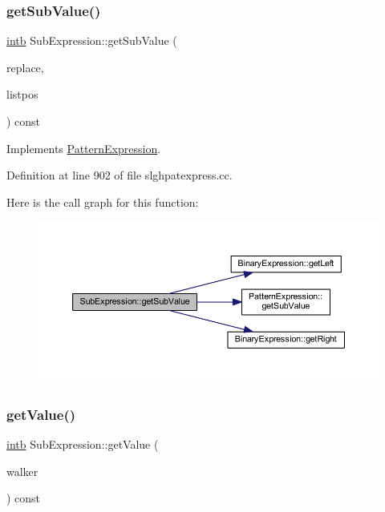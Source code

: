 \subsubsection{\texorpdfstring{getSubValue()}{getSubValue()}}
{\footnotesize\ttfamily \mbox{\hyperlink{types_8h_aa925ba3e627c2df89d5b1cfe84fb8572}{intb}} Sub\+Expression\+::get\+Sub\+Value (\begin{DoxyParamCaption}\item[{const vector$<$ \mbox{\hyperlink{types_8h_aa925ba3e627c2df89d5b1cfe84fb8572}{intb}} $>$ \&}]{replace,  }\item[{int4 \&}]{listpos }\end{DoxyParamCaption}) const\hspace{0.3cm}{\ttfamily [virtual]}}



Implements \mbox{\hyperlink{class_pattern_expression_ade37db4aa76dd442b189bf4a6bb2d9dd}{Pattern\+Expression}}.



Definition at line 902 of file slghpatexpress.\+cc.

Here is the call graph for this function\+:
\nopagebreak
\begin{figure}[H]
\begin{center}
\leavevmode
\includegraphics[width=350pt]{class_sub_expression_a56c441953eedc3a8f55d3b716b7ed7f5_cgraph}
\end{center}
\end{figure}
\mbox{\label{class_sub_expression_a1c565bff8bbdc848b03c49818d13b4a6}} 
\subsubsection{\texorpdfstring{getValue()}{getValue()}}
{\footnotesize\ttfamily \mbox{\hyperlink{types_8h_aa925ba3e627c2df89d5b1cfe84fb8572}{intb}} Sub\+Expression\+::get\+Value (\begin{DoxyParamCaption}\item[{\mbox{\hyperlink{class_parser_walker}{Parser\+Walker}} \&}]{walker }\end{DoxyParamCaption}) const\hspace{0.3cm}{\ttfamily [virtual]}}



